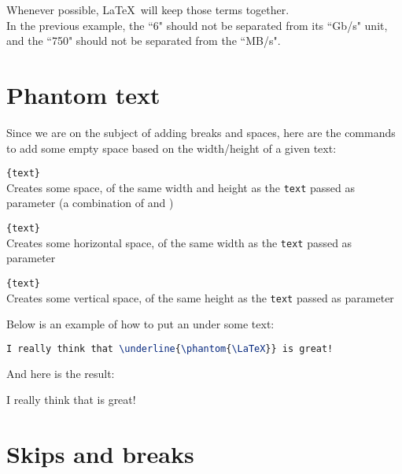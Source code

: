 \medskip

Whenever possible, \LaTeX\ will keep those terms together. \\

In the previous example, the ``6" should not be separated from its ``Gb/s" unit, and the ``750" should not be separated from the ``MB/s".

\bigskip


\section{Phantom text} \label{phantom}

Since we are on the subject of adding breaks and spaces, here are the commands to add some empty space based on the width/height of a given text:

\begin{description}
	\item{\texttt{\{text\}}} \mbox{} \\ 
		Creates some space, of the same width and height as the \texttt{text} passed as parameter
		(a combination of  and )
		
	\item{\texttt{\{text\}}} \mbox{} \\ 
		Creates some horizontal space, of the same width as the \texttt{text} passed as parameter
	\item{\texttt{\{text\}}} \mbox{} \\ 
		Creates some vertical space, of the same height as the \texttt{text} passed as parameter
\end{description}

\newpage

Below is an example of how to put an  under some  text:
\begin{lstlisting}[language=tex]
I really think that \underline{\phantom{\LaTeX}} is great!
\end{lstlisting}

And here is the result:
\begin{mdframed}
I really think that \underline{\phantom{\LaTeX}} is great!
\end{mdframed}

\bigskip

\section{Skips and breaks}


